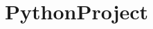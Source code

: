 \chapter{Python\+Project}
\hypertarget{md__r_e_a_d_m_e}{}\label{md__r_e_a_d_m_e}
\label{md__r_e_a_d_m_e_autotoc_md0}%
%
